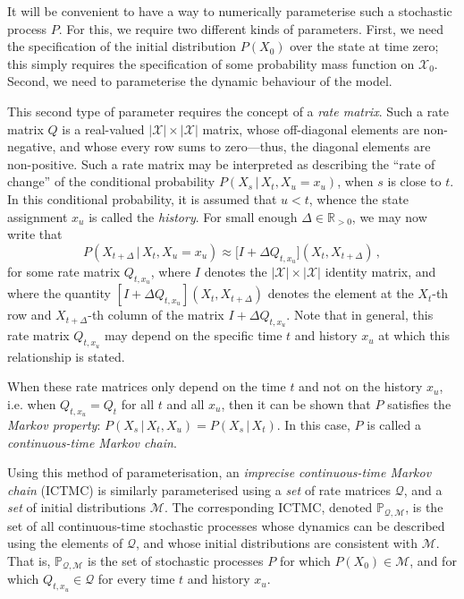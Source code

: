 \documentclass[twoside,11pt]{article}
\newcommand{\reals}{\mathbb{R}}
\newcommand{\realspos}{\reals_{>0}}
\newcommand{\states}{\mathcal{X}}
\newcommand{\rateset}{\mathcal{Q}}
\begin{document}
It will be convenient to have a way to numerically parameterise such a stochastic process $P$. For this, we require two different kinds of parameters. First, we need the specification of the initial distribution $P(X_0)$ over the state at time zero; this simply requires the specification of some probability mass function on $\states_0$. Second, we need to parameterise the dynamic behaviour of the model.

This second type of parameter requires the concept of a \emph{rate matrix}. Such a rate matrix $Q$ is a real-valued $\lvert\states\rvert\times\lvert\states\rvert$ matrix, whose off-diagonal elements are non-negative, and whose every row sums to zero---thus, the diagonal elements are non-positive. Such a rate matrix may be interpreted as describing the ``rate of change'' of the conditional probability $P(X_s\,\vert\,X_t,X_u=x_u)$, when $s$ is close to $t$. In this conditional probability, it is assumed that $u<t$, whence the state assignment $x_u$ is called the \emph{history}. For small enough $\Delta\in\realspos$, we may now write that
\begin{equation*}
P(X_{t+\Delta}\,\vert\,X_t,X_u=x_u) \approx \bigl[I + \Delta Q_{t,x_u}\bigr](X_t, X_{t+\Delta})\,,
\end{equation*}
for some rate matrix $Q_{t,x_u}$, where $I$ denotes the $\lvert\states\rvert\times\lvert\states\rvert$ identity matrix, and where the quantity $[I + \Delta Q_{t,x_u}](X_t,X_{t+\Delta})$ denotes the element at the $X_t$-th row and $X_{t+\Delta}$-th column of the matrix $I + \Delta Q_{t,x_u}$. Note that in general, this rate matrix $Q_{t,x_u}$ may depend on the specific time $t$ and history $x_u$ at which this relationship is stated. %

When these rate matrices only depend on the time $t$ and not on the history $x_u$, i.e. when $Q_{t,x_u}=Q_t$ for all $t$ and all $x_u$, then it can be shown that $P$ satisfies the \emph{Markov property}: $P(X_s\,\vert\,X_t,X_u)=P(X_s\,\vert\,X_t)$. In this case, $P$ is called a \emph{continuous-time Markov chain}.

Using this method of parameterisation, an \emph{imprecise continuous-time Markov chain} (ICTMC) is similarly parameterised using a \emph{set} of rate matrices $\rateset$, and a \emph{set} of initial distributions $\mathcal{M}$. The corresponding ICTMC, denoted $\mathbb{P}_{\rateset,\mathcal{M}}$, is the set of all continuous-time stochastic processes whose dynamics can be described using the elements of $\rateset$, and whose initial distributions are consistent with $\mathcal{M}$. That is, $\mathbb{P}_{\rateset,\mathcal{M}}$ is the set of stochastic processes $P$ for which $P(X_0)\in\mathcal{M}$, and for which $Q_{t,x_u}\in\rateset$ for every time $t$ and history $x_u$.
\end{document}
